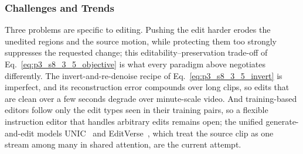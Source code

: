 \subsubsection{Challenges and Trends}
\label{subsubsec:p3_s8_3_5_challenges}
Three problems are specific to editing. Pushing the edit harder erodes the unedited regions and the source motion, while protecting them too strongly suppresses the requested change; this editability--preservation trade-off of Eq.~\eqref{eq:p3_s8_3_5_objective} is what every paradigm above negotiates differently. The invert-and-re-denoise recipe of Eq.~\eqref{eq:p3_s8_3_5_invert} is imperfect, and its reconstruction error compounds over long clips, so edits that are clean over a few seconds degrade over minute-scale video. And training-based editors follow only the edit types seen in their training pairs, so a flexible instruction editor that handles arbitrary edits remains open; the unified generate-and-edit models UNIC~\cite{ye2025unicunifiedincontextvideo} and EditVerse~\cite{ju2025editverseunifyingimagevideo}, which treat the source clip as one stream among many in shared attention, are the current attempt.
